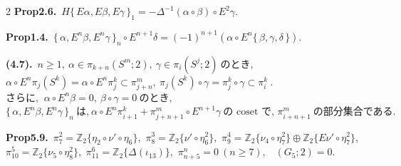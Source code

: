 \documentclass[10pt, leqno]{ltjsarticle}
\newcommand{\toda}[1]{\{\,#1\,\}}              %
\newcommand{\todai}[2][]{\{\,#2\,\}_{#1}}      %
\newcommand{\gen}[1]{\{#1\}}       %
\newcommand{\pis}[2]{\pi_{#1}(#2)}       %
\newcommand{\pit}[2]{\pi_{#1}^{#2}}
\numberwithin{equation}{section}
\theoremstyle{plain}
\theoremstyle{definition}
\theoremstyle{remark}
\begin{document}
\begin{paracol}{2}
\noindent
\textbf{Prop2.6.}\
\(H\todai[1]{E\alpha, E\beta, E\gamma} 
= -\Delta^{-1}(\alpha\circ\beta)\circ E^2\gamma.\)

\noindent
\textbf{Prop1.4.}\
\(\todai[n]{\alpha, E^n\beta, E^n\gamma}\circ E^{n+1}\delta
= (-1)^{n+1}(\alpha\circ E^n\toda{\beta, \gamma, \delta})\).

\noindent
\textbf{(4.7).}\
\(n\ge1, \ \alpha\in\pis{k+n}{S^m; 2},\ \gamma\in\pis{i}{S^j; 2}
\ \text{のとき, }\)\\
\(\alpha\circ E^n\pis{j}{S^k} = \alpha\circ E^n \pit{j}{k}
\subset \pit{j+n}{m},
\ \pis{j}{S^k}\circ\gamma = \pit{j}{k}\circ\gamma \subset\pit{i}{k}\ . \)\\
\(\text{さらに, }\ \alpha\circ E^n\beta=0,\ \beta\circ\gamma = 0 \ \text{のとき, }\)\\
\(\todai[n]{\alpha, E^n\beta, E^n\gamma}\ \text{は,}\
\alpha\circ E^n\pit{i+1}{k} + \pit{j+n+1}{m}\circ E^{n+1}\gamma\
\text{の coset で, }\pit{i+n+1}{m} \ \text{の部分集合である. }\)

\noindent
\textbf{Prop5.9.}\
\(\pi^{2}_{7}=\mathbb Z_2\gen{\eta_{2}\circ\nu'\circ\eta_6},\) \quad
\(\pi^{3}_{8}=\mathbb Z_2\gen{\nu'\circ\eta_6^2},\) \quad
\(\pi^{4}_{9}=\mathbb Z_2\gen{\nu_{4}\circ\eta_7^2}\oplus \mathbb Z_2\gen{E\nu'\circ\eta_7^2},\) \\
\(\pi^{5}_{10}=\mathbb Z_2\gen{\nu_{5}\circ\eta_8^2},\) \quad
\(\pi^{6}_{11}=\mathbb Z_2\gen{\Delta(\iota_{13})},\) \quad
\(\pi^{n}_{n+5}=0\ (n\ge7),\) \
\((G_{5};2)=0.\)






\end{paracol}

\newpage
\end{document}
